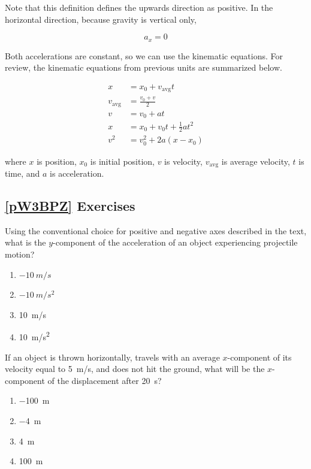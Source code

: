 \documentclass[main-physics.tex]{subfiles}
\begin{document}
Note that this definition defines the upwards direction as positive. In the horizontal direction, because gravity is vertical only,

\begin{equation}
    a_x = 0
\end{equation}

Both accelerations are constant, so we can use the kinematic equations. For review, the kinematic equations from previous units are summarized below.

\begin{align}
    x &= x_0 + v_{\text{avg}} t\\[0.5ex]
    v_{\text{avg}} &= \frac{v_0 + v}{2}\\[0.5ex]
    v &= v_0 + a t\\[0.5ex]
    x &= x_0 + v_0 t + \frac{1}{2} a t^2\\[0.5ex]
    v^2 &= v_0^2 + 2 a (x - x_0)
\end{align}

where $x$ is position, $x_0$ is initial position, $v$ is velocity, $v_{\text{avg}}$ is average velocity, $t$ is time, and $a$ is acceleration.

\subsection*{\ref{pW3BPZ} Exercises}

\begin{exercise} \label{YYBBp5}
    Using the conventional choice for positive and negative axes described in the text, what is the $y$-component of the acceleration of an object experiencing projectile motion?
\end{exercise}

\begin{enumerate}[label=\Alph*.]
    \item $\SI{-10}{m/s}$
    \item $\SI{-10}{m/s^2}$
    \item \SI{10}{m/s}
    \item \SI{10}{m/s^2}
\end{enumerate}

\begin{exercise} \label{EykTi8}
    If an object is thrown horizontally, travels with an average $x$-component of its velocity equal to \SI{5}{m/s}, and does not hit the ground, what will be the $x$-component of the displacement after \SI{20}{s}? 

    \begin{enumerate}[label=\Alph*.]
        \item \SI{-100}{m}
        \item \SI{-4}{m}
        \item \SI{4}{m}
        \item \SI{100}{m}
    \end{enumerate}
\end{exercise}
\end{document}
